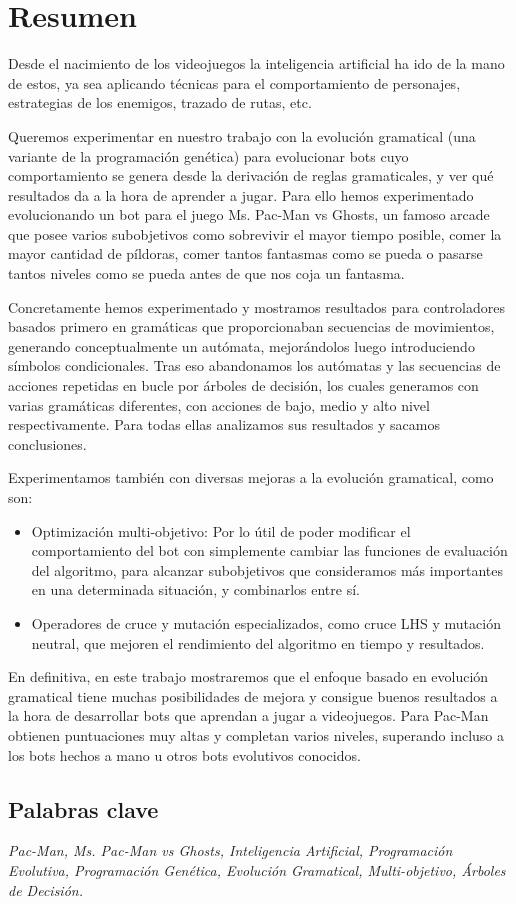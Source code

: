 \chapter{Resumen} \label{cap:resumen}
Desde el nacimiento de los videojuegos la inteligencia artificial ha ido de la mano de estos, ya sea aplicando técnicas para el comportamiento de personajes, estrategias de los enemigos, trazado de rutas, etc.

Queremos experimentar en nuestro trabajo con la evolución gramatical (una variante de la programación genética) para evolucionar bots cuyo comportamiento se genera desde la derivación de reglas gramaticales, y ver qué resultados da a la hora de aprender a jugar. Para ello hemos experimentado evolucionando un bot para el juego Ms. Pac-Man vs Ghosts, un famoso arcade que posee varios subobjetivos como sobrevivir el mayor tiempo posible, comer la mayor cantidad de píldoras, comer tantos fantasmas como se pueda o pasarse tantos niveles como se pueda antes de que nos coja un fantasma.
 
Concretamente hemos experimentado y mostramos resultados para controladores basados primero en gramáticas que proporcionaban secuencias de movimientos, generando conceptualmente un autómata, mejorándolos luego introduciendo símbolos condicionales. 
Tras eso abandonamos los autómatas y las secuencias de acciones repetidas en bucle por árboles de decisión, los cuales generamos con varias gramáticas diferentes, con acciones de bajo, medio y alto nivel respectivamente. Para todas ellas analizamos sus resultados y sacamos conclusiones. 
 
Experimentamos también con diversas mejoras a la evolución gramatical, como son:
\begin{itemize}
\item Optimización multi-objetivo: Por lo útil de poder modificar el comportamiento del bot con simplemente cambiar las funciones de evaluación del algoritmo, para alcanzar subobjetivos que consideramos más importantes en una determinada situación, y combinarlos entre sí.
\item Operadores de cruce y mutación especializados, como cruce LHS y mutación neutral, que mejoren el rendimiento del algoritmo en tiempo y resultados.
\end{itemize}
 
En definitiva, en este trabajo mostraremos que el enfoque basado en evolución gramatical tiene muchas posibilidades de mejora y consigue buenos resultados a la hora de desarrollar bots que aprendan a jugar a videojuegos. Para Pac-Man obtienen puntuaciones muy altas y completan varios niveles, superando incluso a los bots hechos a mano u otros bots evolutivos conocidos.

\section*{Palabras clave}
\textit{Pac-Man, Ms. Pac-Man vs Ghosts, Inteligencia Artificial, Programación Evolutiva, Programación Genética, Evolución Gramatical, Multi-objetivo, Árboles de Decisión.}
